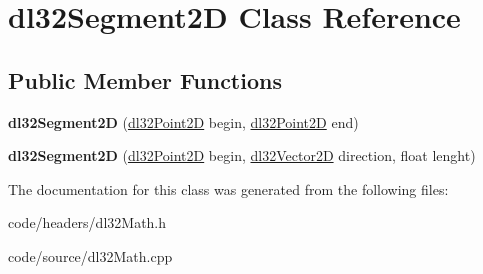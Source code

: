 \hypertarget{classdl32_segment2_d}{\section{dl32\-Segment2\-D Class Reference}
\label{classdl32_segment2_d}
}
\subsection*{Public Member Functions}
\begin{DoxyCompactItemize}
\item 
\hypertarget{classdl32_segment2_d_ad4ab26f90bf92af7a0c18ac001462039}{{\bfseries dl32\-Segment2\-D} (\hyperlink{structdl32_point2_d}{dl32\-Point2\-D} begin, \hyperlink{structdl32_point2_d}{dl32\-Point2\-D} end)}\label{classdl32_segment2_d_ad4ab26f90bf92af7a0c18ac001462039}

\item 
\hypertarget{classdl32_segment2_d_ad2da4245333ff72ac0486e93e9a71038}{{\bfseries dl32\-Segment2\-D} (\hyperlink{structdl32_point2_d}{dl32\-Point2\-D} begin, \hyperlink{structdl32_vector2_d}{dl32\-Vector2\-D} direction, float lenght)}\label{classdl32_segment2_d_ad2da4245333ff72ac0486e93e9a71038}

\end{DoxyCompactItemize}


The documentation for this class was generated from the following files\-:\begin{DoxyCompactItemize}
\item 
code/headers/dl32\-Math.\-h\item 
code/source/dl32\-Math.\-cpp\end{DoxyCompactItemize}
